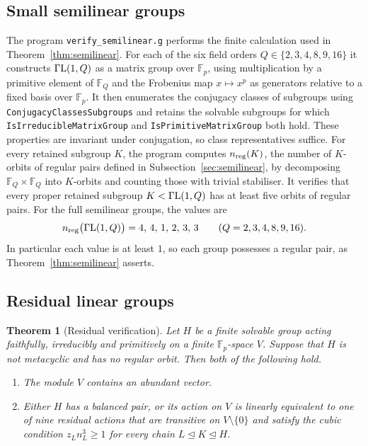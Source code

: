 \documentclass[10pt]{amsart}
\newtheorem{theorem}{Theorem}[section]
\theoremstyle{definition}
\renewcommand{\ge}{\geqslant}
\newcommand{\GammaL}{\Gamma{\rm L}}
\numberwithin{equation}{section}
\numberwithin{table}{section}
\begin{document}
\subsection{Small semilinear groups}
\label{sec:comp-semilinear}
\begin{sloppypar}
The program \texttt{verify\_semilinear.g} performs the finite calculation used in
Theorem~\ref{thm:semilinear}. For each of the six field orders
$Q\in\{2,3,4,8,9,16\}$ it constructs $\GammaL(1,Q)$ as a matrix group over
$\mathbb{F}_p$, using multiplication by a primitive element of
$\mathbb{F}_Q$ and the Frobenius map $x\mapsto x^{p}$ as generators relative to
a fixed basis over $\mathbb{F}_p$. It then enumerates the conjugacy classes of subgroups
using \texttt{ConjugacyClassesSubgroups} and retains the solvable subgroups for
which \texttt{IsIrreducibleMatrixGroup} and
\texttt{IsPrimitiveMatrixGroup} both hold. These properties are
invariant under conjugation, so class representatives suffice. For every
retained subgroup $K$, the program computes $n_{\rm reg}(K)$, the number of
$K$-orbits of regular pairs defined in Subsection~\ref{sec:semilinear}, by
decomposing $\mathbb{F}_Q\times\mathbb{F}_Q$ into $K$-orbits and counting
those with trivial stabiliser. It verifies that every proper retained subgroup
$K<\GammaL(1,Q)$ has at least five orbits of regular pairs. For the full
semilinear groups, the values are
$$
  n_{\rm reg}\bigl(\GammaL(1,Q)\bigr)=4,\,4,\,1,\,2,\,3,\,3\qquad
  (Q=2,3,4,8,9,16).
$$
In particular each value is at least $1$, so each group possesses a regular
pair, as Theorem~\ref{thm:semilinear} asserts.
\end{sloppypar}

\subsection{Residual linear groups}
\label{sec:comp-residual}

\begin{theorem}[Residual verification]\label{thm:residual}
Let $H$ be a finite solvable group acting faithfully, irreducibly and
primitively on a finite $\mathbb{F}_p$-space $V$. Suppose that $H$ is not
metacyclic and has no regular orbit. Then both of the following hold.
\begin{enumerate}
\item The module $V$ contains an abundant vector.
\item Either $H$ has a balanced pair, or its action on $V$ is linearly equivalent to one of nine
  residual actions that are transitive on $V\setminus\{0\}$ and satisfy the
  cubic condition $z_Ln_L^{3}\ge1$ for every chain
  $L\trianglelefteq K\trianglelefteq H$.
\end{enumerate}
\end{theorem}
\end{document}
